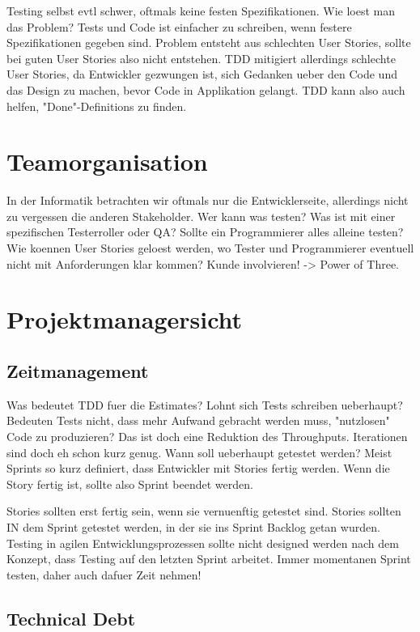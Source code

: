 \documentclass[12pt,DIV14,BCOR10mm,a4paper,twoside,parskip=half-,headsepline,headinclude,english,ngerman,bibliography=totocnumbered]{scrreprt}
\begin{document}
Testing selbst evtl schwer, oftmals keine festen Spezifikationen.
Wie loest man das Problem?
Tests und Code ist einfacher zu schreiben, wenn festere Spezifikationen gegeben sind.
Problem entsteht aus schlechten User Stories, sollte bei guten User Stories also nicht entstehen.
TDD mitigiert allerdings schlechte User Stories, da Entwickler gezwungen ist, sich Gedanken ueber den Code und das Design zu machen, bevor Code in Applikation gelangt.
TDD kann also auch helfen, "Done"-Definitions zu finden.

\section{Teamorganisation}

In der Informatik betrachten wir oftmals nur die Entwicklerseite, allerdings nicht zu vergessen die anderen Stakeholder.
Wer kann was testen?
Was ist mit einer spezifischen Testerroller oder QA?
Sollte ein Programmierer alles alleine testen?
Wie koennen User Stories geloest werden, wo Tester und Programmierer eventuell nicht mit Anforderungen klar kommen?
Kunde involvieren! -> Power of Three.

\section{Projektmanagersicht}
\subsection{Zeitmanagement}

Was bedeutet TDD fuer die Estimates?
Lohnt sich Tests schreiben ueberhaupt?
Bedeuten Tests nicht, dass mehr Aufwand gebracht werden muss, "nutzlosen" Code zu produzieren?
Das ist doch eine Reduktion des Throughputs.
Iterationen sind doch eh schon kurz genug.
Wann soll ueberhaupt getestet werden?
Meist Sprints so kurz definiert, dass Entwickler mit Stories fertig werden.
Wenn die Story fertig ist, sollte also Sprint beendet werden.

Stories sollten erst fertig sein, wenn sie vernuenftig getestet sind.
Stories sollten IN dem Sprint getestet werden, in der sie ins Sprint Backlog getan wurden.
Testing in agilen Entwicklungsprozessen sollte nicht designed werden nach dem Konzept, dass Testing auf den letzten Sprint arbeitet.
Immer momentanen Sprint testen, daher auch dafuer Zeit nehmen!

\subsection{Technical Debt}
\end{document}

